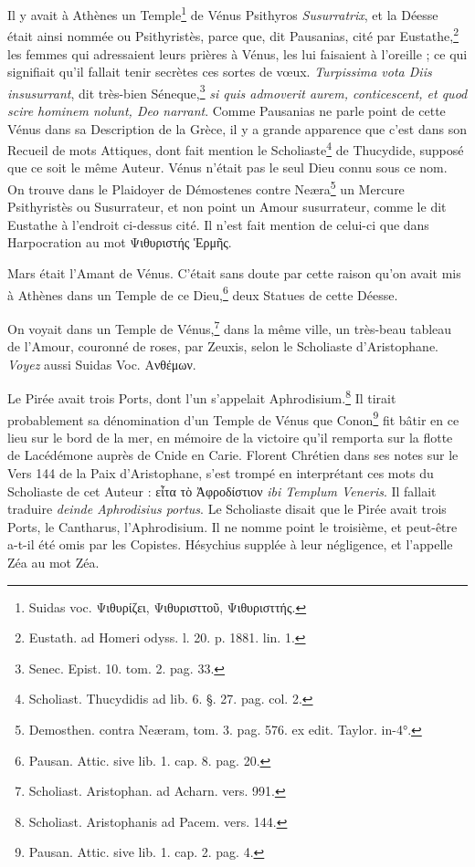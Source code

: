 \documentclass[a4paper, 18pt, oneside]{article}
\begin{document}
Il y avait à Athènes un Temple\footnote{Suidas voc. Ψιθυρίζει, Ψιθυρισττοῦ, Ψιθυρισττής.} de Vénus Psithyros \emph{Susurratrix}, et la Déesse était ainsi nommée ou Psithyristès, parce que, dit Pausanias, cité par Eustathe,\footnote{Eustath. ad Homeri odyss. l. 20. p. 1881. lin. 1.} les femmes qui adressaient leurs prières à Vénus, les lui faisaient à l'oreille ; ce qui signifiait qu'il fallait tenir secrètes ces sortes de vœux. \emph{Turpissima vota Diis insusurrant}, dit très-bien Séneque,\footnote{Senec. Epist. 10. tom. 2. pag. 33.} \emph{si quis admoverit aurem, conticescent, et quod scire hominem nolunt, Deo narrant}. Comme Pausanias ne parle point de cette Vénus dans sa Description de la Grèce, il y a grande apparence que c'est dans son Recueil de mots Attiques, dont fait mention le Scholiaste\footnote{Scholiast. Thucydidis ad lib. 6. §. 27. pag. col. 2.} de Thucydide, supposé que ce soit le même Auteur. Vénus n'était pas le seul Dieu connu sous ce nom. On trouve dans le Plaidoyer de Démostenes contre Neæra\footnote{Demosthen. contra Neæram, tom. 3. pag. 576. ex edit. Taylor. in-4°.} un Mercure Psithyristès ou Susurrateur, et non point un Amour susurrateur, comme le dit Eustathe à l'endroit ci-dessus cité. Il n'est fait mention de celui-ci que dans Harpocration au mot Ψιθυριστής Ἑρμῆς.

Mars était l'Amant de Vénus. C'était sans doute par cette raison qu'on avait mis à Athènes dans un Temple de ce Dieu,\footnote{Pausan. Attic. sive lib. 1. cap. 8. pag. 20.} deux Statues de cette Déesse.

On voyait dans un Temple de Vénus,\footnote{Scholiast. Aristophan. ad Acharn. vers. 991.} dans la même ville, un très-beau tableau de l'Amour, couronné de roses, par Zeuxis, selon le Scholiaste d'Aristophane. \emph{Voyez} aussi Suidas Voc. Ανθέμων.

Le Pirée avait trois Ports, dont l'un s'appelait Aphrodisium.\footnote{Scholiast. Aristophanis ad Pacem. vers. 144.} Il tirait probablement sa dénomination d'un Temple de Vénus que Conon\footnote{Pausan. Attic. sive lib. 1. cap. 2. pag. 4.} fit bâtir en ce lieu sur le bord de la mer, en mémoire de la victoire qu'il remporta sur la flotte de Lacédémone auprès de Cnide en Carie. Florent Chrétien dans ses notes sur le Vers 144 de la Paix d'Aristophane, s'est trompé en interprétant ces mots du Scholiaste de cet Auteur : εἶτα τὸ Ἀφροδίστιον \emph{ibi Templum Veneris}. Il fallait traduire \emph{deinde Aphrodisius portus}. Le Scholiaste disait que le Pirée avait trois Ports, le Cantharus, l'Aphrodisium. Il ne nomme point le troisième, et peut-être a-t-il été omis par les Copistes. Hésychius supplée à leur négligence, et l'appelle Zéa au mot Zéa.
\end{document}
